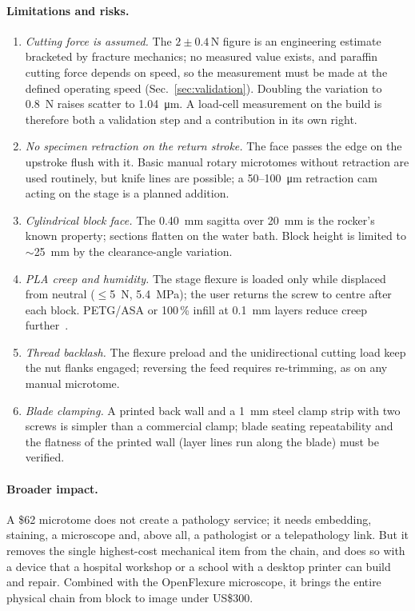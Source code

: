 \documentclass[11pt,a4paper]{article}
\begin{document}
\paragraph{Limitations and risks.}
\begin{enumerate}[nosep]
\item \emph{Cutting force is assumed.} The $2\pm0.4$\,\si{\newton} figure is an engineering estimate bracketed by fracture mechanics; no measured value exists, and paraffin cutting force depends on speed, so the measurement must be made at the defined operating speed (Sec.~\ref{sec:validation}). Doubling the variation to \SI{0.8}{\newton} raises scatter to \SI{1.04}{\micro\metre}. A load-cell measurement on the build is therefore both a validation step and a contribution in its own right.
\item \emph{No specimen retraction on the return stroke.} The face passes the edge on the upstroke flush with it. Basic manual rotary microtomes without retraction are used routinely, but knife lines are possible; a 50--\SI{100}{\micro\metre} retraction cam acting on the stage is a planned addition.
\item \emph{Cylindrical block face.} The \SI{0.40}{\milli\metre} sagitta over \SI{20}{\milli\metre} is the rocker's known property; sections flatten on the water bath. Block height is limited to $\sim$\SI{25}{\milli\metre} by the clearance-angle variation.
\item \emph{PLA creep and humidity.} The stage flexure is loaded only while displaced from neutral ($\leq$\SI{5}{\newton}, \SI{5.4}{\mega\pascal}); the user returns the screw to centre after each block. PETG/ASA or 100\,\% infill at \SI{0.1}{\milli\metre} layers reduce creep further~\citep{Waseem2020}.
\item \emph{Thread backlash.} The flexure preload and the unidirectional cutting load keep the nut flanks engaged; reversing the feed requires re-trimming, as on any manual microtome.
\item \emph{Blade clamping.} A printed back wall and a \SI{1}{\milli\metre} steel clamp strip with two screws is simpler than a commercial clamp; blade seating repeatability and the flatness of the printed wall (layer lines run along the blade) must be verified.
\end{enumerate}

\paragraph{Broader impact.} A \$62 microtome does not create a pathology service; it needs embedding, staining, a microscope and, above all, a pathologist or a telepathology link. But it removes the single highest-cost mechanical item from the chain, and does so with a device that a hospital workshop or a school with a desktop printer can build and repair. Combined with the OpenFlexure microscope, it brings the entire physical chain from block to image under US\$300.
\end{document}

